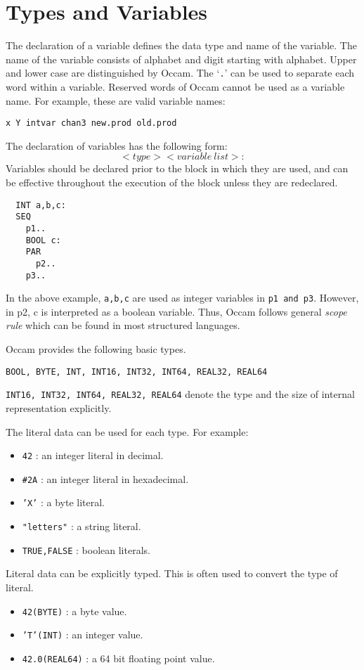 \section{Types and Variables}


The declaration of a variable defines the data type and name of the
variable.  The name of the variable consists of alphabet and digit
starting with alphabet.  Upper and lower case are distinguished by
Occam.  The `{\tt .}' can be used to separate each word within a
variable.  Reserved words of Occam cannot be used as a variable name.
For example, these are valid variable names:
\begin{lin}
{\tt x Y intvar chan3 new.prod old.prod}
\end{lin}

The declaration of variables has the following form:
\[
	<type> <variable\ list> :
\]
Variables should be declared prior to the block in which they are
used, and can be effective throughout the execution of the block
unless they are redeclared. 
\begin{lin}
\begin{verbatim}
  INT a,b,c:
  SEQ
    p1..
    BOOL c:
    PAR
      p2..
    p3..
\end{verbatim}
\end{lin}
In the above example, {\tt a,b,c} are used as integer variables in
{\tt p1 and p3}.  However, in p2, c is interpreted as a boolean
variable.  Thus, Occam follows general {\em scope rule} which can be
found in most structured languages.

Occam provides the following basic types.
\begin{lin}
{\tt BOOL, BYTE, INT, INT16, INT32, INT64, REAL32, REAL64}
\end{lin}
{\tt INT16, INT32, INT64, REAL32, REAL64} denote the type and the size
of internal representation explicitly.  

The literal data can be used for each type.  For example:
\begin{itemize}
\item {\tt 42} : an integer literal in decimal.
\item {\tt \#2A} : an integer literal in hexadecimal.
\item {\tt 'X'} : a byte literal.
\item {\tt "letters"} : a string literal.
\item {\tt TRUE,FALSE} : boolean literals.
\end{itemize}
Literal data can be explicitly typed. This is often used to convert the
type of literal.
\begin{itemize}
\item {\tt 42(BYTE)} : a byte value.
\item {\tt 'T'(INT)} : an integer value.
\item {\tt 42.0(REAL64)} : a 64 bit floating point value.
\end{itemize}

